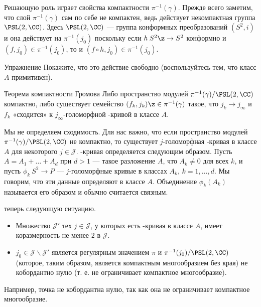 Решающую роль играет свойства компактности $\pi^{-1} (\gamma)$.
Прежде всего заметим, что слой $\pi^{-1} (\gamma)$ сам по себе не компактен, ведь действует некомпактная группа $\PSL(2, \CC)$.
Здесь $\PSL(2, \CC)$ --- группа конформных преобразований $(S^2, i)$ и она действует на $\pi^{-1} (j_0)$ поскольку
если $h\: S^2 \z\to S^2$ конформно и $(f, j_0) \in \pi^{-1} (j_0)$, то и $(f \circ h, j_0) \in \pi^{-1} (j_0)$.

\begin{ex*}{Упражнение}
Покажите, что это действие свободно (воспользуйтесь тем, что класс $A$ примитивен).
\end{ex*}

\begin{thm*}{Теорема компактности Громова}
Либо пространство модулей $\pi^{-1} (\gamma)/\PSL(2, \CC)$ компактно, либо существует семейство $(f_k, j_k) \z\in \pi^{-1} (\gamma)$ такое, что $j_k \to j_\infty$ и $f_k$ «сходится» к $j_\infty$-голоморфной -кривой в классе $A$.
\end{thm*}

Мы не определяем сходимость.
Для нас важно, что если пространство модулей $\pi^{-1} (\gamma)/\PSL(2, \CC)$ не компактно, то существует $j$-голоморфная -кривая в классе $A$ для некоторого $j \in \mathcal{J}$.
-кривая определяется следующим образом.
Пусть $A = A_1 +\dots+ A_d$ при $d > 1$ --- такое разложение $A$, что $A_k \ne 0$ для всех $k$, и пусть $\phi_k \: S^2 \to P$ --- $j$-голоморфные кривые в классах $A_k$, $k = 1,\dots,d$.
Мы говорим, что эти данные определяют  в классе $A$.
Объединение $\phi_k (A_k)$ называется его образом и обычно считается связным.

 теперь следующую ситуацию.
\begin{itemize}
\item Множество $\mathcal{J}'$ тех $j \in \mathcal{J}$, у которых есть -кривая в классе $A$, имеет коразмерность не менее $2$ в $\mathcal{J}$.

\item $j_0 \in \mathcal{J}\backslash \mathcal{J}'$ является регулярным значением $\pi$ и $\pi^{-1} (j_0)/\PSL(2, \CC)$ (которое, таким образом, является компактным многообразием без края) не кобордантно нулю (т. е. не ограничивает компактное многообразие).
 
\end{itemize}
Например, точка не кобордантна нулю, так как она не ограничивает компактное многообразие.

